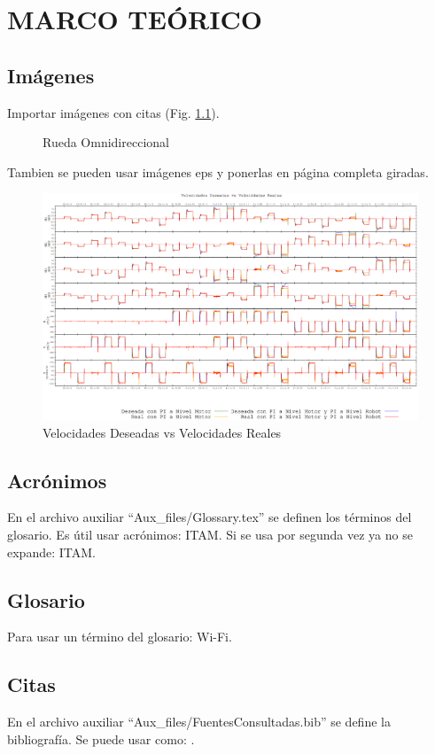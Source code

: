 \chapter{MARCO TEÓRICO}
\label{ch2:MarcoTeorico}

\section{Imágenes}
Importar imágenes con citas (Fig. \ref{fig:SP}).
\begin{figure}
	\caption{Rueda Omnidireccional \protect\cite{itam-gary} }
	\label{fig:SP}
\end{figure}

Tambien se pueden usar imágenes eps y ponerlas en página completa giradas.

\begin{figure}
	\centering
		\includegraphics[width=\textwidth,height=0.9\textheight]{Figures/160517-vels-motVSmotrob_slide.eps}
	\caption{Velocidades Deseadas vs Velocidades Reales}
	\label{fig:vels_real_vs_des_mot}
\end{figure}



\section{Acrónimos}
En el archivo auxiliar ``Aux\_files/Glossary.tex'' se definen los términos del glosario.
Es útil usar acrónimos: \gls{ITAM}. Si se usa por segunda vez ya no se expande: \gls{ITAM}. 

\section{Glosario}
Para usar un término del glosario: \gls{Wi-Fi}.

\section{Citas}
En el archivo auxiliar ``Aux\_files/FuentesConsultadas.bib'' se define la bibliografía. Se puede usar como: \cite{turing2009computing}.

{ \blindtext \blindtext \Blindtext}








